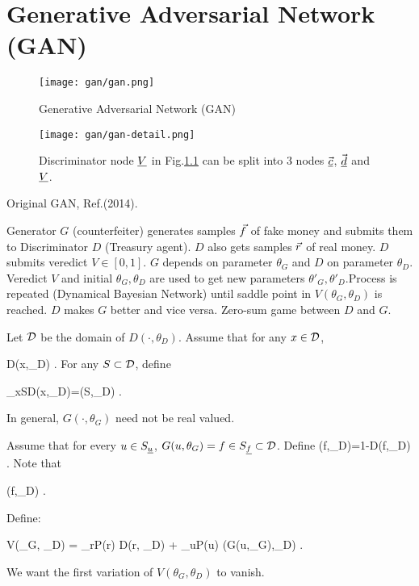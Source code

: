 \chapter{Generative Adversarial Network (GAN)}

\begin{figure}[h!]
\centering
\texttt{[image: gan/gan.png]}
\caption{Generative Adversarial  Network (GAN)} 
\label{fig-gan}
\end{figure}

\begin{figure}[h!]
\centering
\texttt{[image: gan/gan-detail.png]}
\caption{Discriminator node $\underline{V}$ in Fig.\ref{fig-gan} can be
split into 3 nodes $\vec{{\underline{c}}}$, $\vec{{\underline{d}}}$ and $\underline{V}$.} 
\label{fig-gan-detail}
\end{figure}

Original GAN, 
Ref.\cite{gf2014}(2014). 

Generator $G$ (counterfeiter) generates samples ${\vec{f}}$ of fake money and submits them to Discriminator $D$ (Treasury agent). $D$ also gets samples ${\vec{r}}$ of real money. $D$ submits veredict $V\in [0,1]$. $G$ depends on parameter $\theta_G$ and $D$ on parameter $\theta_D$. Veredict $V$ and initial $\theta_G, \theta_D$ are used to get new parameters $\theta'_G, \theta'_D$.Process is repeated (Dynamical Bayesian Network) until saddle point in $V(\theta_G, \theta_D)$ is reached. $D$ makes $G$ better and vice versa.  Zero-sum game between $D$ and $G$.



Let ${\cal D}$ be the domain of $D(\cdot, \theta_D)$. Assume that for any $x\in {\cal D}$,

\leq D(x,\theta_D)
\;.
\eeq
For any $S\subset{\cal D}$, define

\beq
\sum_{x\in S}D(x,\theta_D)=\lam(S,\theta_D)
\;.
\eeq


 In general, 
$G(\cdot,\theta_G)$ need not be real valued. 

Assume that for every $u\in S_{\underline{u}}$,
 $G(u,\theta_G)=f\in S_{\underline{f}}\subset {\cal D}$. Define
\beq
{}(f,\theta_D)=1-D(f,\theta_D)
\;.
\eeq
Note that

\leq{}(f,\theta_D)
\;.
\eeq

Define:

\beq
V(\theta_G, \theta_D) =
\sum_{r}P(r)
\log D(r, \theta_D)
+ \sum_{u}P(u)\log
{}(G(u,\theta_G),\theta_D)
\;.	
\eeq

We want the first variation of $V(\theta_G, \theta_D)$ to vanish.




